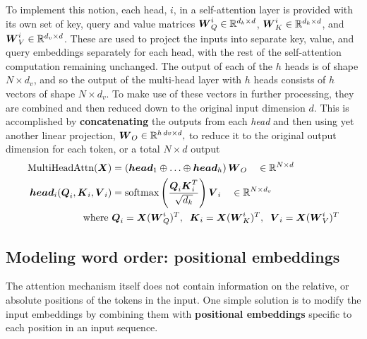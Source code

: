 \documentclass[11pt]{article}
\begin{document}
To implement this notion, each head, $i$, in a self-attention layer is provided with its own set of key, query and value matrices $\boldsymbol{W}^{i}_Q \in {\mathbb R}^{d_{k}\times d}$, $\boldsymbol{W}^{i}_K \in {\mathbb R}^{d_{k}\times d}$, and $\boldsymbol{W}^{i}_V \in {\mathbb R}^{d_{v}\times d}$. These are used to project the inputs into separate key, value, and query embeddings separately for each head, with the rest of the self-attention computation remaining unchanged.  The output of each of the $h$ heads is of shape $N \times d_v$, and so the output of the multi-head layer with $h$ heads consists of $h$ vectors of shape $N \times d_v$. To make use of these vectors in further processing, they are combined and then reduced down to the original input dimension $d$. This is accomplished by \textbf{concatenating} the outputs from each \emph{head} and then using yet another linear projection, $\boldsymbol{W}_O \in {\mathbb R}^{h\,dv\times d},$ to reduce it to the original output dimension for each token, or a total $N \times d$ output
\begin{align*}
\text{MultiHeadAttn}(\boldsymbol{X}) &= \left(\boldsymbol{head}_1 \oplus \ldots \oplus \boldsymbol{head}_h \right)\boldsymbol{W}_{O} \quad \in {\mathbb R}^{N \times d} \\
\boldsymbol{head}_i(\boldsymbol{Q}_{i}, \boldsymbol{K}_{i},  \boldsymbol{V}_{i}) &=  \text{softmax}\left(\frac{\boldsymbol{Q}_{i}\boldsymbol{K}_{i}^{T}}{\sqrt{d_{k}}}\right)\boldsymbol{V}_{i} \quad \in {\mathbb R}^{N \times d_{v}} \\
\text{where }&\boldsymbol{Q}_{i} = \boldsymbol{X}(\boldsymbol{W}^{i}_{Q})^{T},\;\;\boldsymbol{K}_{i} = \boldsymbol{X}(\boldsymbol{W}^{i}_{K})^{T},\;\;\boldsymbol{V}_{i} = \boldsymbol{X}(\boldsymbol{W}^{i}_{V})^{T}
\end{align*}




\subsection{Modeling word order: positional embeddings}
The attention mechanism itself does not contain information on the relative, or absolute positions of the tokens in the input.  One simple solution is to modify the input embeddings by combining them with \textbf{positional embeddings} specific to each position in an input sequence.
\end{document}

